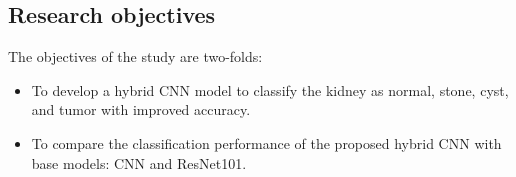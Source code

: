 \subsection{Research objectives}
The objectives of the study are two-folds:

\begin{itemize}
    \item To develop a hybrid CNN model to classify the kidney as normal, stone, cyst, and tumor with improved accuracy.
    \item To compare the classification performance of the proposed hybrid CNN with base models: CNN and ResNet101. 
\end{itemize}

